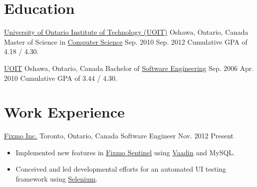 
  \section{Education}

  \educationEntry
    {\href{http://www.uoit.ca/}{University of Ontario Institute of Technology (UOIT)}}
    {Oshawa, Ontario, Canada}
    {Master of Science in \href{http://gradstudies.uoit.ca/EN/main/future\_students/masters\_programs/computerscience.html}{Computer Science}}
    {Sep. 2010}
    {Sep. 2012}
    {Cumulative GPA of 4.18 / 4.30.}

  \educationEntry
    {\href{http://www.uoit.ca/}{UOIT}}
    {Oshawa, Ontario, Canada}
    {Bachelor of \href{http://engineering.uoit.ca/undergraduate/software/}{Software Engineering}}
    {Sep. 2006}
    {Apr. 2010}
    {Cumulative GPA of 3.44 / 4.30.}

  \section{Work Experience}

  \workEntry
    {\href{http://fixmo.com/}{Fixmo Inc.}}
    {Toronto, Ontario, Canada}
    {Software Engineer}
    {Nov. 2012}
    {Present}
    {
      \begin{itemize}[noitemsep,nolistsep]
        \item Implemented new features in \href{http://fixmo.com/products/sentinel}{Fixmo Sentinel} using \href{https://vaadin.com/}{Vaadin} and MySQL.
        \item Conceived and led developmental efforts for an automated UI testing framework using \href{https://seleniumhq.org/}{Selenium}.
      \end{itemize}
    }

